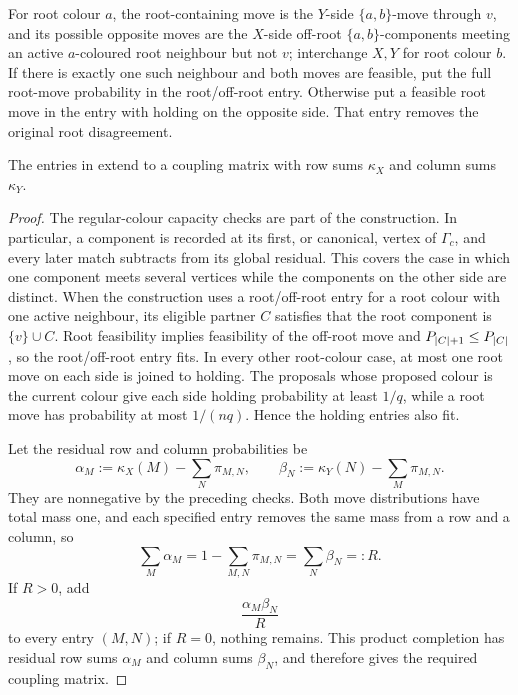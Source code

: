 \begin{definition}
For root colour \(a\), the root-containing move is the \(Y\)-side
\(\{a,b\}\)-move through \(v\), and its possible opposite moves are the
\(X\)-side off-root \(\{a,b\}\)-components meeting an active
\(a\)-coloured root neighbour but not \(v\); interchange \(X,Y\) for
root colour \(b\).  If there is exactly one such neighbour and both moves
are feasible, put the full root-move probability in the root/off-root
entry.  Otherwise put a feasible root move in the entry with holding on the
opposite side.  That entry removes the original root disagreement.
\end{definition}

\begin{lemma}
\label{lem:cv-completion}
The entries in  extend to a coupling matrix
with row sums \(\kappa_X\) and column sums \(\kappa_Y\).
\end{lemma}

\begin{proof}
The regular-colour capacity checks are part of the construction.  In
particular, a component is recorded at its first, or canonical, vertex of
\(\Gamma_c\), and every later match subtracts from its global residual.
This covers the case in which one component meets several vertices while
the components on the other side are distinct.  When the construction uses
a root/off-root entry for a root colour with one active neighbour, its
eligible partner \(C\) satisfies that the root component is
\(\{v\}\cup C\).  Root feasibility implies feasibility of the
off-root move and \(P_{\left|C\right|+1}\le P_{\left|C\right|}\), so the root/off-root
entry fits.  In every other root-colour case, at most one root move on each
side is joined to holding.  The proposals whose proposed colour is the
current colour give each side holding probability at least \(1/q\), while
a root move has probability at most \(1/(nq)\).  Hence the holding entries
also fit.

Let the residual row and column probabilities be
\begin{equation}\label{eq:cv-residual-masses}
  \alpha_M:=\kappa_X(M)-\sum_N\pi_{M,N},
  \qquad
  \beta_N:=\kappa_Y(N)-\sum_M\pi_{M,N}.
\end{equation}
They are nonnegative by the preceding checks.  Both move distributions
have total mass one, and each specified entry removes the same mass from a
row and a column, so
\[
  \sum_M\alpha_M
  =1-\sum_{M,N}\pi_{M,N}
  =\sum_N\beta_N
  =:R.
\]
If \(R>0\), add
\[
  \frac{\alpha_M\beta_N}{R}
\]
to every entry \((M,N)\); if \(R=0\), nothing remains.  This product
completion has residual row sums \(\alpha_M\) and column sums
\(\beta_N\), and therefore gives the required coupling matrix.
\end{proof}

